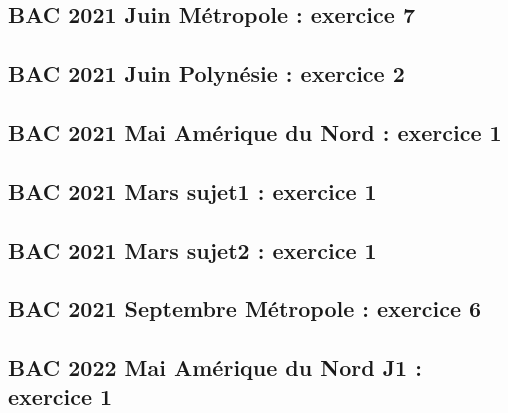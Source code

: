 \documentclass[lang=fr,edition=teacher,layout=sheet]{mxbook}
\begin{document}
\begingroup\endgroup
\par\bigskip
{}\subsection*{BAC 2021 Juin Métropole : exercice 7}
\begingroup\endgroup
\par\bigskip
{}\subsection*{BAC 2021 Juin Polynésie : exercice 2}
\begingroup\endgroup
\par\bigskip
{}\subsection*{BAC 2021 Mai Amérique du Nord : exercice 1}
\begingroup\endgroup
\par\bigskip
{}\subsection*{BAC 2021 Mars sujet1 : exercice 1}
\begingroup\endgroup
\par\bigskip
{}\subsection*{BAC 2021 Mars sujet2 : exercice 1}
\begingroup\endgroup
\par\bigskip
{}\subsection*{BAC 2021 Septembre Métropole : exercice 6}
\begingroup\endgroup
\par\bigskip
{}\subsection*{BAC 2022 Mai Amérique du Nord J1 : exercice 1}
\end{document}
